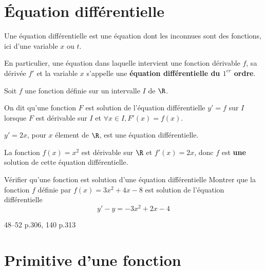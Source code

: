 \documentclass[a4paper]{article}
\begin{document}
\pagebreak

\section{\'Equation différentielle}
\begin{definition*}{}{}
  Une équation différentielle est une équation dont les inconnues sont des fonctions, ici d'une variable $x$ ou $t$.
  
  En particulier, une équation dans laquelle intervient une fonction dérivable $f$, sa dérivée $f'$ et la variable $x$ s'appelle 
  une \textbf{équation différentielle du $1^{er}$ ordre}.
  \end{definition*}
  
  \begin{definition*}{}{}
    Soit $f$ une fonction définie sur un intervalle $I$ de $\R$.
    
    On dit qu'une fonction $F$ est solution de l'équation différentielle $y'=f$ sur $I$ 
    lorsque $F$ est dérivable sur $I$  et $\forall x \in I, F'(x)=f(x)$.
    \end{definition*}

\begin{example*}{}{}
$y'=2x$, pour $x$ élement de $\R$, est une équation différentielle. 

La fonction $f(x)=x^2$ est dérivable sur $\R$ et $f'(x)=2x$, donc $f$ est \textbf{une} solution 
de cette équation différentielle.
\end{example*}

\begin{methode*}[sidebyside, righthand width=2.2cm,segmentation code={}, sidebyside align=top]{Vérifier qu'une fonction est solution d'une équation différentielle}{}
Montrer que la fonction $f$ définie par $f(x)=3x^2+4x-8$ est solution de l'équation différentielle $$y'-y=-3x^2+2x-4$$

    \tcblower
    \vspace{4cm}
  
\end{methode*}

\begin{exercices}{}{}
	48--52 p.306, 140 p.313
\end{exercices}

\section{Primitive d'une fonction}
\end{document}
